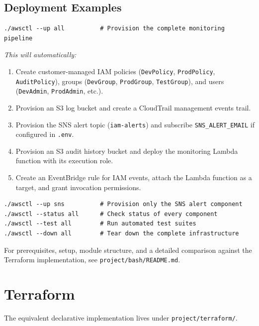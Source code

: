 \documentclass[11pt,a4paper]{report}
\begin{document}
\subsection{Deployment Examples}

\begin{lstlisting}
./awsctl --up all          # Provision the complete monitoring pipeline
\end{lstlisting}

\textit{This will automatically:}

\begin{enumerate}[leftmargin=1.6em]
  \item Create customer-managed IAM policies (\texttt{DevPolicy}, \texttt{ProdPolicy}, \texttt{AuditPolicy}), groups (\texttt{DevGroup}, \texttt{ProdGroup}, \texttt{TestGroup}), and users (\texttt{DevAdmin}, \texttt{ProdAdmin}, etc.).
  \item Provision an S3 log bucket and create a CloudTrail management events trail.
  \item Provision the SNS alert topic (\texttt{iam-alerts}) and subscribe \texttt{SNS\_ALERT\_EMAIL} if configured in \texttt{.env}.
  \item Provision an S3 audit history bucket and deploy the monitoring Lambda function with its execution role.
  \item Create an EventBridge rule for IAM events, attach the Lambda function as a target, and grant invocation permissions.
\end{enumerate}

\begin{lstlisting}
./awsctl --up sns          # Provision only the SNS alert component
./awsctl --status all      # Check status of every component
./awsctl --test all        # Run automated test suites
./awsctl --down all        # Tear down the complete infrastructure
\end{lstlisting}

\begin{notebox}[Note]
For prerequisites, setup, module structure, and a detailed comparison
against the Terraform implementation, see \texttt{project/bash/README.md}.
\end{notebox}

\section{Terraform}

The equivalent declarative implementation lives under
\texttt{project/terraform/}.
\end{document}
